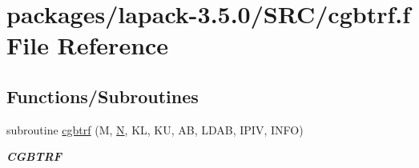 \hypertarget{cgbtrf_8f}{}\section{packages/lapack-\/3.5.0/\+S\+R\+C/cgbtrf.f File Reference}
\label{cgbtrf_8f}
\subsection*{Functions/\+Subroutines}
\begin{DoxyCompactItemize}
\item 
subroutine \hyperlink{group__complexGBcomputational_ga58d67a3a5354c78dfd0f94625bfe03b1}{cgbtrf} (M, \hyperlink{polmisc_8c_a0240ac851181b84ac374872dc5434ee4}{N}, K\+L, K\+U, A\+B, L\+D\+A\+B, I\+P\+I\+V, I\+N\+F\+O)
\begin{DoxyCompactList}\small\item\em {\bfseries C\+G\+B\+T\+R\+F} \end{DoxyCompactList}\end{DoxyCompactItemize}
